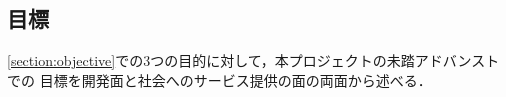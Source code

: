 \subsection{目標}

\ref*{section:objective}での3つの目的に対して，本プロジェクトの未踏アドバンストでの
目標を開発面と社会へのサービス提供の面の両面から述べる．
